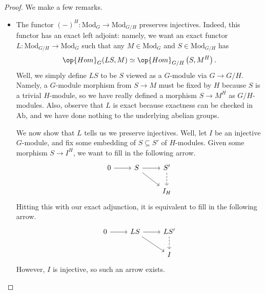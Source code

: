 \documentclass[../notes.tex]{subfiles}
\begin{document}
\begin{proof}
	We make a few remarks.
	\begin{itemize}
		\item The functor $(-)^H\colon\mathrm{Mod}_G\to\mathrm{Mod}_{G/H}$ preserves injectives. Indeed, this functor has an exact left adjoint: namely, we want an exact functor $L\colon\mathrm{Mod}_{G/H}\to\mathrm{Mod}_G$ such that any $M\in\mathrm{Mod}_G$ and $S\in\mathrm{Mod}_{G/H}$ has
		\[\op{Hom}_G(LS,M)\simeq\op{Hom}_{G/H}\left(S,M^H\right).\]
		Well, we simply define $LS$ to be $S$ viewed as a $G$-module via $G\to G/H$. Namely, a $G$-module morphism from $S\to M$ must be fixed by $H$ because $S$ is a trivial $H$-module, so we have really defined a morphism $S\to M^H$ as $G/H$-modules. Also, observe that $L$ is exact because exactness can be checked in $\mathrm{Ab}$, and we have done nothing to the underlying abelian groups.

		We now show that $L$ tells us we preserve injectives. Well, let $I$ be an injective $G$-module, and fix some embedding of $S\subseteq S'$ of $H$-modules. Given some morphism $S\to I^H$, we want to fill in the following arrow.
		\[\begin{tikzcd}
			0 & S & {S'} \\
			&& {I_H}
			\arrow[from=1-2, to=2-3]
			\arrow[dashed, from=1-3, to=2-3]
			\arrow[from=1-1, to=1-2]
			\arrow[from=1-2, to=1-3]
		\end{tikzcd}\]
		Hitting this with our exact adjunction, it is equivalent to fill in the following arrow.
		\[\begin{tikzcd}
			0 & LS & {LS'} \\
			&& I
			\arrow[from=1-2, to=2-3]
			\arrow[dashed, from=1-3, to=2-3]
			\arrow[from=1-1, to=1-2]
			\arrow[from=1-2, to=1-3]
		\end{tikzcd}\]
		However, $I$ is injective, so such an arrow exists.


\end{itemize}
\end{proof}
\end{document}
